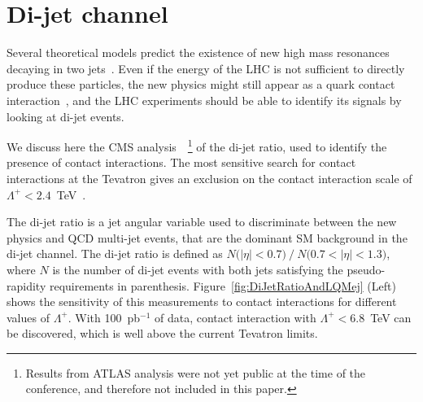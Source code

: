 \documentclass{cimento}
\begin{document}
\section{Di-jet channel} \label{dijet}
Several theoretical models predict the existence of new 
high mass resonances decaying in two 
jets~\cite{Baur:1989kv,Bagger:1987fz,Angelopoulos:1986uq}.
Even if the energy of the LHC is not sufficient to directly produce 
these particles, the new physics might still appear as 
a quark contact interaction~\cite{Eichten:1983hw}, 
and the LHC experiments should 
be able to identify its signals by looking at di-jet events.

We discuss here the CMS analysis~\cite{DIJETSNOTE}~\footnote{Results 
from ATLAS analysis were not yet public at the time 
of the conference, and therefore not included in this paper.}
of the di-jet ratio, used to identify the presence of contact interactions. 
The most sensitive search for contact interactions at the Tevatron 
gives an exclusion on the contact interaction scale 
of $\Lambda^{+} < 2.4$~TeV~\cite{Abbott:1998wh}.  

The di-jet ratio is a jet angular variable used to 
discriminate between the new physics and QCD multi-jet events, 
that are the dominant SM background in the di-jet channel. The di-jet ratio is 
defined as $N\mbox{(}|\eta|<0.7\mbox{)}~/~N\mbox{(}0.7<|\eta|< 1.3 \mbox{)}$, 
where $N$ is the number of di-jet events with both jets satisfying the 
pseudo-rapidity requirements in parenthesis. 
Figure~\ref{fig:DiJetRatioAndLQMej} (Left) shows the sensitivity of this 
measurements to contact interactions for different values of $\Lambda^{+}$. 
With 100~pb$^{-1}$ of data, contact interaction with
$\Lambda^{+} < 6.8$~TeV can be discovered, which is well above the 
current Tevatron limits.
 
\end{document}
